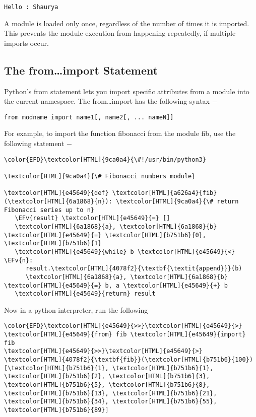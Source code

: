 \documentclass{scrartcl}
\newcommand{\EFv}[1]{\textcolor{EFv}{#1}} %
\begin{document}
\texttt{Hello : Shaurya}

A module is loaded only once, regardless of the number of times it is imported. This prevents the module execution from happening repeatedly, if multiple imports occur.

\subsection{The from\ldots{}import Statement}
\label{sec:orgce592e6}
Python's from statement lets you import specific attributes from a module into the current namespace. The from\ldots{}import has the following syntax −

\texttt{from modname import name1[, name2[, ... nameN]]}

For example, to import the function fibonacci from the module fib, use the following statement −

\begin{Code}
\begin{Verbatim}[]
\color{EFD}\textcolor[HTML]{9ca0a4}{\#!/usr/bin/python3}

\textcolor[HTML]{9ca0a4}{\# Fibonacci numbers module}

\textcolor[HTML]{e45649}{def} \textcolor[HTML]{a626a4}{fib}(\textcolor[HTML]{6a1868}{n}): \textcolor[HTML]{9ca0a4}{\# return Fibonacci series up to n}
   \EFv{result} \textcolor[HTML]{e45649}{=} []
   \textcolor[HTML]{6a1868}{a}, \textcolor[HTML]{6a1868}{b} \textcolor[HTML]{e45649}{=} \textcolor[HTML]{b751b6}{0}, \textcolor[HTML]{b751b6}{1}
   \textcolor[HTML]{e45649}{while} b \textcolor[HTML]{e45649}{<} \EFv{n}:
      result.\textcolor[HTML]{4078f2}{\textbf{\textit{append}}}(b)
      \textcolor[HTML]{6a1868}{a}, \textcolor[HTML]{6a1868}{b} \textcolor[HTML]{e45649}{=} b, a \textcolor[HTML]{e45649}{+} b
   \textcolor[HTML]{e45649}{return} result
\end{Verbatim}
\end{Code}

Now in a python interpreter, run the following
\begin{Code}
\begin{Verbatim}[]
\color{EFD}\textcolor[HTML]{e45649}{>>}\textcolor[HTML]{e45649}{>} \textcolor[HTML]{e45649}{from} fib \textcolor[HTML]{e45649}{import} fib
\textcolor[HTML]{e45649}{>>}\textcolor[HTML]{e45649}{>} \textcolor[HTML]{4078f2}{\textbf{fib}}(\textcolor[HTML]{b751b6}{100})
[\textcolor[HTML]{b751b6}{1}, \textcolor[HTML]{b751b6}{1}, \textcolor[HTML]{b751b6}{2}, \textcolor[HTML]{b751b6}{3}, \textcolor[HTML]{b751b6}{5}, \textcolor[HTML]{b751b6}{8}, \textcolor[HTML]{b751b6}{13}, \textcolor[HTML]{b751b6}{21}, \textcolor[HTML]{b751b6}{34}, \textcolor[HTML]{b751b6}{55}, \textcolor[HTML]{b751b6}{89}]
\end{Verbatim}
\end{Code}
\end{document}
